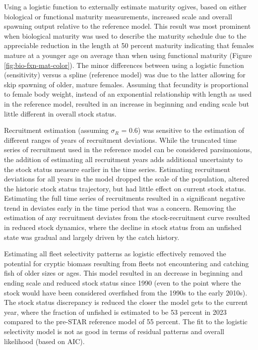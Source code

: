 \documentclass[11pt,
  english,
  letterpaper,
]{article}
\begin{document}
Using a logistic function to externally estimate maturity ogives, based on either biological or functional maturity measurements, increased scale and overall spawning output relative to the reference model. This result was most prominent when biological maturity was used to describe the maturity schedule due to the appreciable reduction in the length at 50 percent maturity indicating that females mature at a younger age on average than when using functional maturity (Figure \ref{fig:bio-fxn-mat-color}). The minor differences between using a logistic function (sensitivity) versus a spline (reference model) was due to the latter allowing for skip spawning of older, mature females. Assuming that fecundity is proportional to female body weight, instead of an exponential relationship with length as used in the reference model, resulted in an increase in beginning and ending scale but little different in overall stock status.

Recruitment estimation (assuming \(\sigma_R\) = 0.6) was sensitive to the estimation of different ranges of years of recruitment deviations. While the truncated time series of recruitment used in the reference model can be considered parsimonious, the addition of estimating all recruitment years adds additional uncertainty to the stock status measure earlier in the time series. Estimating recruitment deviations for all years in the model dropped the scale of the population, altered the historic stock status trajectory, but had little effect on current stock status. Estimating the full time series of recruitments resulted in a significant negative trend in deviates early in the time period that was a concern. Removing the estimation of any recruitment deviates from the stock-recruitment curve resulted in reduced stock dynamics, where the decline in stock status from an unfished state was gradual and largely driven by the catch history.

Estimating all fleet selectivity patterns as logistic effectively removed the potential for cryptic biomass resulting from fleets not encountering and catching fish of older sizes or ages. This model resulted in an decrease in beginning and ending scale and reduced stock status since 1990 (even to the point where the stock would have been considered overfished from the 1990s to the early 2010s). The stock status discrepancy is reduced the closer the model gets to the current year, where the fraction of unfished is estimated to be 53 percent in 2023 compared to the pre-STAR reference model of 55 percent. The fit to the logistic selectivity model is not as good in terms of residual patterns and overall likelihood (based on AIC).
\end{document}
